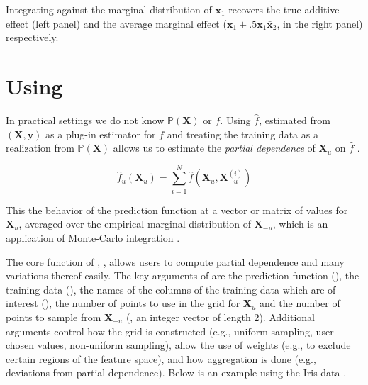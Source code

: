 Integrating against the marginal distribution of $\mathbf{x}_1$ recovers the true additive effect (left panel) and the average marginal effect ($\mathbf{x}_1 + .5 \mathbf{x}_1 \bar{\mathbf{x}}_2$, in the right panel) respectively.

\section{Using }

In practical settings we do not know $\mathbb{P}(\mathbf{X})$ or $f$. Using $\hat{f}$, estimated from $(\mathbf{X}, \mathbf{y})$ as a plug-in estimator for $f$ and  treating the training data as a realization from $\mathbb{P}(\mathbf{X})$ allows us to estimate the \emph{partial dependence} of $\mathbf{X}_u$ on $\hat{f}$ \cite{friedman2001greedy}.

$$\hat{f}_u (\mathbf{X}_u) = \sum_{i = 1}^N \hat{f} (\mathbf{X}_u, \mathbf{X}_{-u}^{(i)}) \label{eq:pd}$$

This the behavior of the prediction function at a vector or matrix of values for $\mathbf{X}_u$, averaged over the empirical marginal distribution of $\mathbf{X}_{-u}$, which is an application of Monte-Carlo integration \citep{metropolis1949monte,hammersley1964general}.

The core function of , , allows users to compute partial dependence and many variations thereof easily. The key arguments of  are the prediction function (), the training data (), the names of the columns of the training data which are of interest (), the number of points to use in the grid for $\mathbf{X}_u$ and the number of points to sample from $\mathbf{X}_{-u}$ (, an integer vector of length 2). Additional arguments control how the grid is constructed (e.g., uniform sampling, user chosen values, non-uniform sampling), allow the use of weights (e.g., to exclude certain regions of the feature space), and how aggregation is done (e.g., deviations from partial dependence). Below is an example using the Iris data \citep{anderson1936species}.

